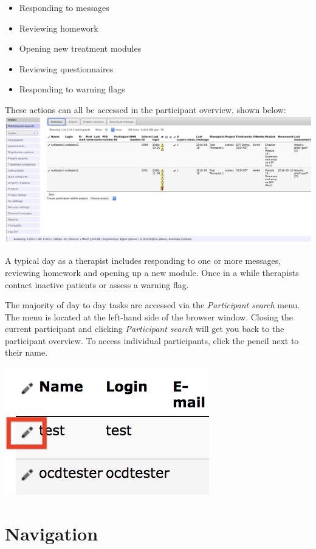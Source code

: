 \documentclass[]{book}
\providecommand{\tightlist}{%
  \setlength{\itemsep}{0pt}\setlength{\parskip}{0pt}}
\theoremstyle{definition}
\theoremstyle{definition}
\theoremstyle{definition}
\theoremstyle{remark}
\begin{document}
\begin{itemize}
\tightlist
\item
  Responding to messages
\item
  Reviewing homework
\item
  Opening new treatment modules
\item
  Reviewing questionnaires
\item
  Responding to warning flags
\end{itemize}

These actions can all be accessed in the participant overview, shown
below: \includegraphics{images/participant-overview.png}

A typical day as a therapist includes responding to one or more
messages, reviewing homework and opening up a new module. Once in a
while therapists contact inactive patients or assess a warning flag.

The majority of day to day tasks are accessed via the \emph{Participant
search} menu. The menu is located at the left-hand side of the browser
window. Closing the current participant and clicking \emph{Participant
search} will get you back to the participant overview. To access
individual participants, click the pencil next to their name.

\includegraphics{images/pencil.png}

\hypertarget{navigation}{%
\section{Navigation}\label{navigation}}
\end{document}
